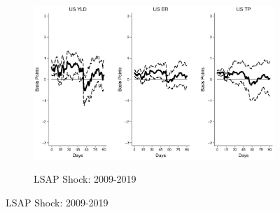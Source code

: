\documentclass{article}
\begin{document}
\begin{figure}[tbph]
	\begin{subfigure}[t]{\textwidth}
		\begin{center}
			\includegraphics[trim={0cm 0cm 0cm 0cm},clip,height=0.26\textheight,width=1\textwidth]{../Figures/LPs/LagDep-FX/LSAP/US/DCMP/LSAPUSDnomyptp24m.eps} \\
			\caption{LSAP Shock: 2009-2019} \label{subfig:LPUS2Ylsap}
		\end{center}
	\end{subfigure}

\end{figure}

\pagebreak[4]
\end{document}
